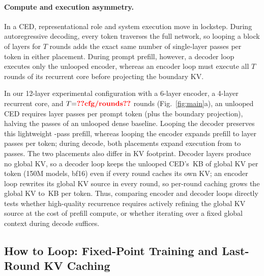 \paragraph{Compute and execution asymmetry.} 
In a CED, representational role and system execution move in lockstep. During autoregressive decoding, every token traverses the full network, so looping a block of layers for $T$ rounds adds the exact same number of single-layer passes per token in either placement. During prompt prefill, however, a decoder loop executes only the unlooped encoder, whereas an encoder loop must execute all $T$ rounds of its recurrent core before projecting the boundary KV. 

In our 12-layer experimental configuration with a 6-layer encoder, a 4-layer recurrent core, and $T{=}\val{cfg/rounds}$ rounds (Fig.~\ref{fig:main}a), an unlooped CED requires  layer passes per prompt token (plus the boundary projection), halving the  passes of an unlooped dense baseline. Looping the decoder preserves this lightweight -pass prefill, whereas looping the encoder expands prefill to  layer passes per token; during decode, both placements expand execution from  to  passes. The two placements also differ in KV footprint. Decoder layers produce no global KV, so a decoder loop keeps the unlooped CED's \,KB of global KV per token (150M models, bf16) even if every round caches its own KV; an encoder loop rewrites its global KV source in every round, so per-round caching grows the global KV to \,KB per token. Thus, comparing encoder and decoder loops directly tests whether high-quality recurrence requires actively refining the global KV source at the cost of prefill compute, or whether iterating over a fixed global context during decode suffices.

\subsection{How to Loop: Fixed-Point Training and Last-Round KV Caching}
\label{sec:method-train}

